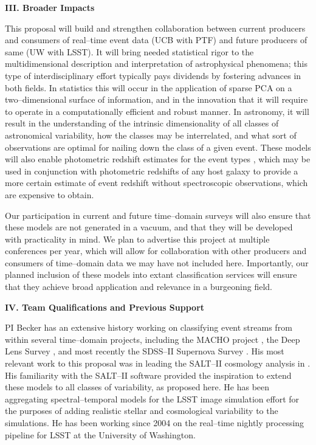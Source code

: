 
\bigskip \centerline{\bf III. Broader Impacts} \smallskip

This proposal will build and strengthen collaboration between current producers
and consumers of real--time event data (UCB with PTF) and future producers of
same (UW with LSST).  It will bring needed statistical rigor to the
multidimensional description and interpretation of astrophysical phenomena; this
type of interdisciplinary effort typically pays dividends by fostering advances
in both fields.  In statistics this will occur in the application of sparse PCA
on a two--dimensional surface of information, and in the innovation that it will
require to operate in a computationally efficient and robust manner.  In
astronomy, it will result in the understanding of the intrinsic dimensionality
of all classes of astronomical variability, how the classes may be interrelated,
and what sort of observations are optimal for nailing down the class of a given
event.  These models will also enable photometric redshift estimates for the
event types \citep[e.g.][]{2010ApJ...717...40K}, which may be used in
conjunction with photometric redshifts of any host galaxy
\citep[e.g.][]{1962IAUS...15..390B} to provide a more certain estimate of event
redshift without spectroscopic observations, which are expensive to obtain.

Our participation in current and future time--domain surveys will also ensure
that these models are not generated in a vacuum, and that they will be developed
with practicality in mind.  We plan to advertise this project at multiple
conferences per year, which will allow for collaboration with other producers
and consumers of time--domain data we may have not included here. Importantly,
our planned inclusion of these models into extant classification services will
ensure that they achieve broad application and relevance in a burgeoning field.


\bigskip \centerline{\bf IV. Team Qualifications and Previous Support}
\smallskip

 \smallskip

PI Becker has an extensive history working on classifying event streams from
within several time--domain projects, including the MACHO project
\citep{2000PhDT.......258B}, the Deep Lens Survey \citep{2004ApJ...611..418B},
and most recently the SDSS--II Supernova Survey
\citep{2008AJ....135..338F,2008AJ....135..348S}.  His most relevant work to this
proposal was in leading the SALT--II cosmology analysis in
\cite{2009ApJS..185...32K}.  His familiarity with the SALT--II software provided
the inspiration to extend these models to all classes of variability, as
proposed here. He has been aggregating spectral--temporal models for the LSST
image simulation effort \citep{2010SPIE.7738E..53C} for the purposes of adding
realistic stellar and cosmological variability to the simulations.  He has been
working since 2004 on the real--time nightly processing pipeline for LSST at the
University of Washington.

